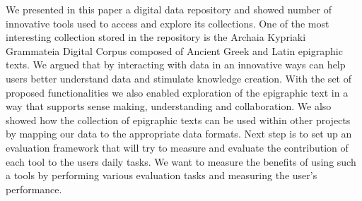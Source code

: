 \documentclass[amsthm,ebook]{saparticle}
\begin{document}
We presented in this paper a digital data repository and showed number of innovative tools used to access and explore
its collections. One of the most interesting collection stored in the repository is the Archaia Kypriaki Grammateia
Digital Corpus composed of Ancient Greek and Latin epigraphic texts. We argued that by interacting with data in an
innovative ways can help users better understand data and stimulate knowledge creation. With the set of proposed
functionalities we also enabled exploration of the epigraphic text in a way that supports sense making, understanding
and collaboration. We also showed how the collection of epigraphic texts can be used within other projects by mapping
our data to the appropriate data formats. Next step is to set up an evaluation framework that will try to measure and
evaluate the contribution of each tool to the users daily tasks. We want to measure the benefits of using such a tools
by performing various evaluation tasks and measuring the user's performance. 




\end{document}

